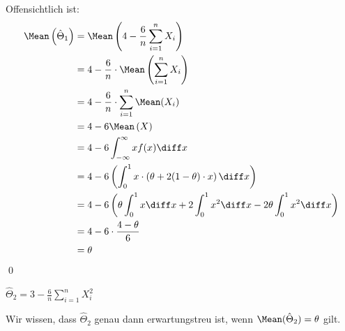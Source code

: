 \documentclass{abgabe}
\begin{document}
\begin{questions}
\begin{parts}
\begin{subparts}
\begin{solution}
                Offensichtlich ist: 
                \begin{alignat*}{1}
                    \Mean\left( \hat{\Theta}_1 \right) & = \Mean\left( 4 - \frac{6}{n} \sum_{i=1}^{n} X_i \right)                                                              \\ 
                                                       & = 4 - \frac{6}{n} \cdot \Mean\left( \sum_{i=1}^{n} X_i \right)                                                        \\ 
                                                       & = 4 - \frac{6}{n} \cdot \sum_{i=1}^{n}  \Mean (X_i)                                                                   \\ 
                                                       & = 4 - 6 \Mean\left( X \right)                                                                                         \\ 
                                                       & = 4 - 6 \int_{-\infty}^{\infty} xf(x) \diff x                                                                         \\ 
                                                       & = 4 - 6 \left(  \int_{0}^{1} x\cdot \left( \theta + 2(1-\theta)\cdot x \right) \diff x \right)                        \\ 
                                                       & = 4 - 6 \left( \theta \int_{0}^{1} x \diff x + 2 \int_{0}^{1} x^2 \diff x - 2\theta  \int_{0}^{1} x^2 \diff x \right) \\ 
                                                       & = 4 - 6 \cdot \frac{4 - \theta}{6}                                                                                    \\ 
                                                       & = \theta
                \end{alignat*}
                \qed
            \end{solution}
            
            \newpage
            \subpart $\hat{\Theta}_2 = 3 - \frac{6}{n} \sum_{i=1}^{n} X_i^2$
            \begin{solution}
                Wir wissen, dass $\hat{\Theta}_2$ genau dann erwartungstreu ist, wenn $\Mean(\hat{\Theta}_2) = \theta$ gilt.
                

\end{solution}
\end{subparts}
\end{parts}
\end{questions}
\end{document}
